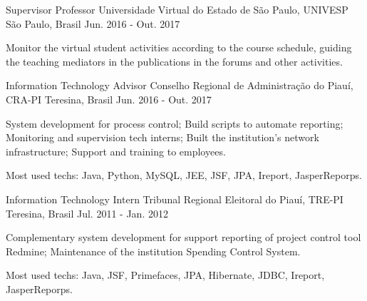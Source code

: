 \begin{cventries}

  \cventry
    {Supervisor Professor} %
    {Universidade Virtual do Estado de São Paulo, UNIVESP} %
    {São Paulo, Brasil} %
    {Jun. 2016 - Out. 2017} %
    {
      \begin{cvitems} %
        \item {Monitor the virtual student activities according to the course schedule, guiding the teaching mediators in the publications in the forums and other activities.}
      \end{cvitems}
    }


  \cventry
    {Information Technology Advisor} %
    {Conselho Regional de Administração do Piauí, CRA-PI} %
    {Teresina, Brasil} %
    {Jun. 2016 - Out. 2017} %
    {
      \begin{cvitems} %
        \item {System development for process control; Build scripts to automate reporting; Monitoring and supervision tech interns; Built the institution's network infrastructure; Support and training to employees.}
        \item {Most used techs: Java, Python, MySQL, JEE, JSF, JPA, Ireport, JasperReporps.}
      \end{cvitems}
    }


  \cventry
    {Information Technology Intern} %
    {Tribunal Regional Eleitoral do Piauí, TRE-PI} %
    {Teresina, Brasil} %
    {Jul. 2011 - Jan. 2012} %
    {
      \begin{cvitems} %
        \item {Complementary system development for support reporting of project control tool Redmine; Maintenance of the institution Spending Control System.}
        \item {Most used techs: Java, JSF, Primefaces, JPA, Hibernate, JDBC, Ireport, JasperReporps.}
      \end{cvitems}
    }


\end{cventries}
